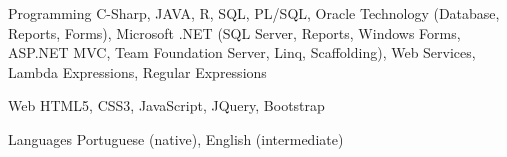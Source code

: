 

\begin{cvskills}

  \cvskill
    {Programming} %
    {C-Sharp, JAVA, R, SQL, PL/SQL, Oracle Technology (Database, Reports, Forms), Microsoft .NET (SQL Server, Reports, Windows Forms, ASP.NET MVC, Team Foundation Server, Linq, Scaffolding), Web Services, Lambda Expressions, Regular Expressions} %

  \cvskill
    {Web} %
    {HTML5, CSS3, JavaScript, JQuery, Bootstrap} %

  \cvskill
    {Languages} %
    {Portuguese (native), English (intermediate)} %

\end{cvskills}
